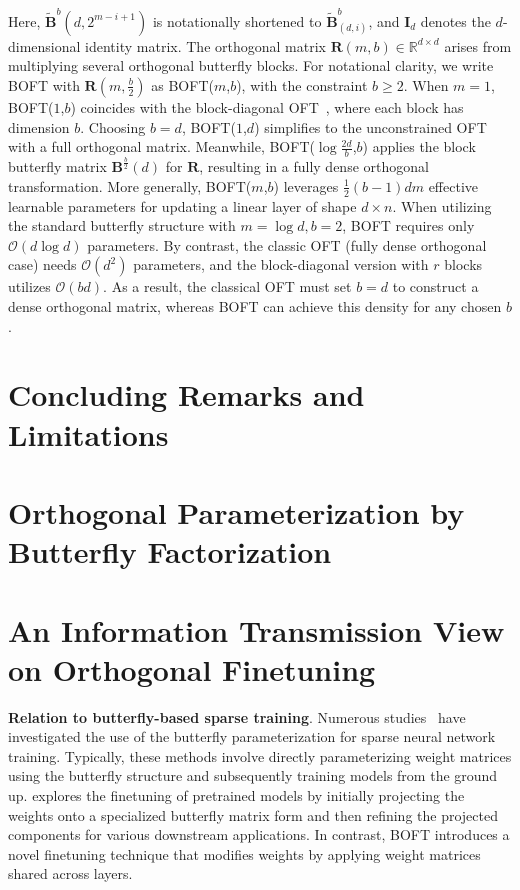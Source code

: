 Here, $\tilde{\bm{B}}^b(d,2^{m - i+1})$ is notationally shortened to $\tilde{\bm{B}}^b_{(d,i)}$, and $\bm{I}_d$ denotes the $d$-dimensional identity matrix. The orthogonal matrix $\bm{R}(m,b)\in\mathbb{R}^{d\times d}$ arises from multiplying several orthogonal butterfly blocks. For notational clarity, we write BOFT with $\bm{R}(m,\frac{b}{2})$ as BOFT($m$,$b$), with the constraint $b\geq 2$. When $m=1$, BOFT($1$,$b$) coincides with the block-diagonal OFT~\cite{qiu2023controlling}, where each block has dimension $b$. Choosing $b=d$, BOFT($1$,$d$) simplifies to the unconstrained OFT~\cite{qiu2023controlling} with a full orthogonal matrix. Meanwhile, BOFT($\log \frac{2d}{b}$,$b$) applies the block butterfly matrix $\bm{B}^{\frac{b}{2}}(d)$ for $\bm{R}$, resulting in a fully dense orthogonal transformation. More generally, BOFT($m$,$b$) leverages $\frac{1}{2}(b-1)dm$ effective learnable parameters for updating a linear layer of shape $d\times n$. When utilizing the standard butterfly structure with $m=\log d, b=2$, BOFT requires only $\mathcal{O}(d\log d)$ parameters. By contrast, the classic OFT (fully dense orthogonal case) needs $\mathcal{O}(d^2)$ parameters, and the block-diagonal version with $r$ blocks utilizes $\mathcal{O}(bd)$. As a result, the classical OFT must set $b=d$ to construct a dense orthogonal matrix, whereas BOFT can achieve this density for any chosen $b$.

\section{Concluding Remarks and Limitations}

\section{Orthogonal Parameterization by Butterfly Factorization}

\section{An Information Transmission View on Orthogonal Finetuning}

\textbf{Relation to butterfly-based sparse training}. Numerous studies~\cite{dao2019learning,dao2019kaleidoscope,chen2022pixelated,dao2022monarch} have investigated the use of the butterfly parameterization for sparse neural network training. Typically, these methods involve directly parameterizing weight matrices using the butterfly structure and subsequently training models from the ground up. \cite{dao2022monarch} explores the finetuning of pretrained models by initially projecting the weights onto a specialized butterfly matrix form and then refining the projected components for various downstream applications. In contrast, BOFT introduces a novel finetuning technique that modifies weights by applying weight matrices shared across layers.

